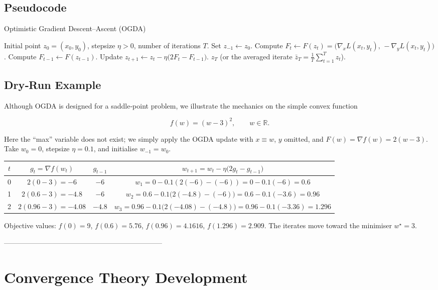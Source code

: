 \documentclass[11pt]{article}
\newcommand{\R}{\mathbb{R}}
\begin{document}
\subsection*{Pseudocode}
\begin{algorithm}[H]
\caption{Optimistic Gradient Descent–Ascent (OGDA)}
\begin{algorithmic}[1]
\REQUIRE Initial point $z_0=(x_0,y_0)$, stepsize $\eta>0$, number of iterations $T$.
\STATE Set $z_{-1}\gets z_0$.
    \STATE Compute $F_t \gets F(z_t)=\bigl(\nabla_x L(x_t,y_t),\,-\nabla_y L(x_t,y_t)\bigr)$.
    \STATE Compute $F_{t-1} \gets F(z_{t-1})$.
    \STATE Update $z_{t+1}\gets z_t-\eta\bigl(2F_t-F_{t-1}\bigr)$.
\ENDFOR
\RETURN $z_T$ (or the averaged iterate $\bar z_T=\frac1T\sum_{t=1}^T z_t$).
\end{algorithmic}
\end{algorithm}

\subsection*{Dry‑Run Example}
Although OGDA is designed for a saddle‑point problem, we illustrate the mechanics on the simple convex function  

\[
f(w)=(w-3)^2,
\qquad w\in\R.
\]

Here the “max” variable does not exist; we simply apply the OGDA update with $x\equiv w$, $y$ omitted, and $F(w)=\nabla f(w)=2(w-3)$.  
Take $w_0=0$, stepsize $\eta=0.1$, and initialise $w_{-1}=w_0$.

\begin{center}
\begin{tabular}{c|c|c|c}
$t$ & $g_{t}= \nabla f(w_t)$ & $g_{t-1}$ & $w_{t+1}=w_t-\eta\bigl(2g_t-g_{t-1}\bigr)$ \\ \hline
0 & $2(0-3)=-6$ & $-6$ & $w_1=0-0.1(2(-6)-(-6))=0-0.1(-6)=0.6$ \\[2mm]
1 & $2(0.6-3)=-4.8$ & $-6$ & $w_2=0.6-0.1\bigl(2(-4.8)-(-6)\bigr)=0.6-0.1(-3.6)=0.96$ \\[2mm]
2 & $2(0.96-3)=-4.08$ & $-4.8$ & $w_3=0.96-0.1\bigl(2(-4.08)-(-4.8)\bigr)=0.96-0.1(-3.36)=1.296$
\end{tabular}
\end{center}
Objective values: $f(0)=9$, $f(0.6)=5.76$, $f(0.96)=4.1616$, $f(1.296)=2.909$. The iterates move toward the minimiser $w^\star=3$.

--------------------------------------------------------------------

\section*{Convergence Theory Development}
\end{document}
